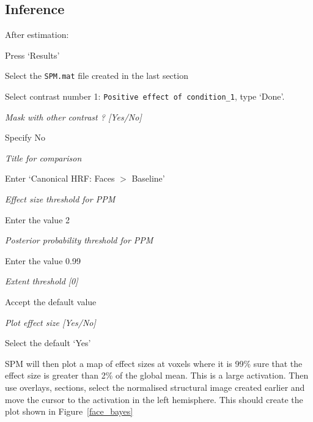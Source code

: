 \subsection{Inference}

After estimation:

\bi
\item{Press `Results'}
\item{Select the \verb!SPM.mat! file created in the last section}
\item{Select contrast number 1: \verb!Positive effect of condition_1!, type `Done'.}
\item{\em Mask with other contrast ? [Yes/No]}
\item{Specify No}
\item{\em Title for comparison}
\item{Enter `Canonical HRF: Faces $>$ Baseline'}
\item{\em Effect size threshold for PPM}
\item{Enter the value 2}
\item{\em Posterior probability threshold for PPM}
\item{Enter the value 0.99}
\item{\em Extent threshold [0]}
\item{Accept the default value}
\item{\em Plot effect size [Yes/No]}
\item{Select the default `Yes'}
\ei

SPM will then plot a map of effect sizes at voxels where it is 99\% sure that the effect size is greater than 2\% of the global mean. This is a large activation. Then use overlays, sections, select the normalised structural image created earlier and move the cursor to the activation in the left hemisphere. This should create the plot shown in Figure~\ref{face_bayes}

